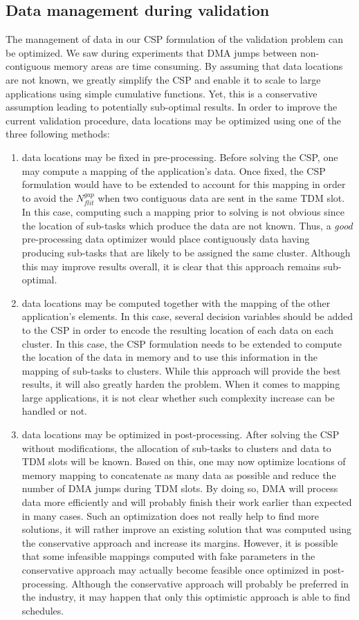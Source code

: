 \documentclass[main.tex]{subfiles}
\begin{document}
\subsection{Data management during validation}
The management of data in our CSP formulation of the validation problem can be optimized. We saw during experiments that DMA jumps between non-contiguous memory areas are time consuming. By assuming that data locations are not known, we greatly simplify the CSP and enable it to scale to large applications using simple cumulative functions. Yet, this is a conservative assumption leading to potentially sub-optimal results. In order to improve the current validation procedure, data locations may be optimized using one of the three following methods: 
\begin{enumerate}
    \item data locations may be fixed in pre-processing. Before solving the CSP, one may compute a mapping of the application's data. Once fixed, the CSP formulation would have to be extended to account for this mapping in order to avoid the $N_{flit}^{gap}$ when two contiguous data are sent in the same TDM slot. In this case, computing such a mapping prior to solving is not obvious since the location of sub-tasks which produce the data are not known. Thus, a \emph{good} pre-processing data optimizer would place contiguously data having producing sub-tasks that are likely to be assigned the same cluster. Although this may improve results overall, it is clear that this approach remains sub-optimal.
    \item data locations may be computed together with the mapping of the other application's elements. In this case, several decision variables should be added to the CSP in order to encode the resulting location of each data on each cluster. In this case, the CSP formulation needs to be extended to compute the location of the data in memory and to use this information in the mapping of sub-tasks to clusters. While this approach will provide the best results, it will also greatly harden the problem. When it comes to mapping large applications, it is not clear whether such complexity increase can be handled or not.
    \item data locations may be optimized in post-processing. After solving the CSP without modifications, the allocation of sub-tasks to clusters and data to TDM slots will be known. Based on this, one may now optimize locations of memory mapping to concatenate as many data as possible and reduce the number of DMA jumps during TDM slots. By doing so, DMA will process data more efficiently and will probably finish their work earlier than expected in many cases. Such an optimization does not really help to find more solutions, it will rather improve an existing solution that was computed using the conservative approach and increase its margins. However, it is possible that some infeasible mappings computed with fake parameters in the conservative approach may actually become feasible once optimized in post-processing. Although the conservative approach will probably be preferred in the industry, it may happen that only this optimistic approach is able to find schedules.
\end{enumerate}
\end{document}
